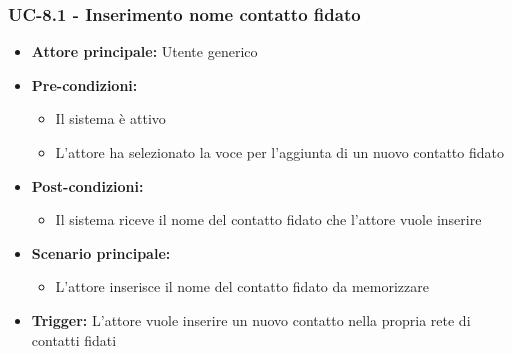 \documentclass[a4paper,12pt]{article}
\begin{document}
\subsubsection{UC-8.1 - Inserimento nome contatto fidato} \label{subsec:UC-8.1}
\begin{itemize}
    \item \textbf{Attore principale:} Utente generico
    \item \textbf{Pre-condizioni:}
    \begin{itemize}
        \item Il sistema è attivo
        \item L'attore ha selezionato la voce per l'aggiunta di un nuovo contatto fidato
    \end{itemize}
    \item \textbf{Post-condizioni:} 
    \begin{itemize}
        \item Il sistema riceve il nome del contatto fidato che l'attore vuole inserire
    \end{itemize}
    \item \textbf{Scenario principale:} 
    \begin{itemize}
        \item L'attore inserisce il nome del contatto fidato da memorizzare
    \end{itemize}
    \item \textbf{Trigger:} L'attore vuole inserire un nuovo contatto nella propria rete di contatti fidati
\end{itemize}
\end{document}
